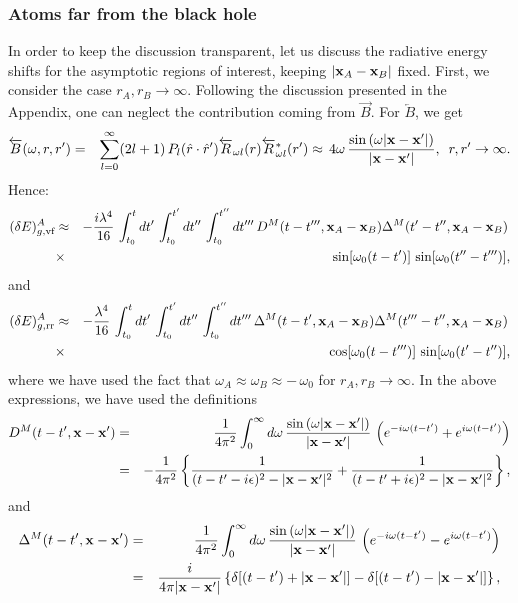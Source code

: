 \documentclass[twocolumn,prd,aps,showpacs,amsmath,amssymb]{revtex4-1}
\def\bea{\begin{eqnarray}}
\def\eea{\end{eqnarray}}
\def\nn{\nonumber}
\begin{document}
\begin{widetext}
\subsubsection{Atoms far from the black hole}
\label{sub:far}
%
In order to keep the discussion transparent, let us discuss the
radiative energy shifts for the asymptotic regions of interest,
keeping $|{\bf x}_{A} - {\bf x}_{B}|$ fixed. First, we consider the
case $r_{A}, r_{B} \to \infty$. Following the discussion presented in
the Appendix, one can neglect the contribution coming from
$\overrightarrow{B}$. For $\overleftarrow{B}$, we get 
%
\bea
\overleftarrow{B}(\omega, r, r') &=& \sum_{l=0}^{\infty}(2l +
1)\,P_{l}(\hat{r} \cdot \hat{r}')\overleftarrow{R}_{\omega
  l}(r)\overleftarrow{R}^{*}_{\omega l}(r')  
\approx\, 4\omega\,\frac{\sin\left(\omega|{\bf x} - {\bf
      x}'|\right)}{|{\bf x} - {\bf x}'|},\,\,\, r, r' \to \infty. 
\eea
%
Hence:
%
\bea
(\delta E)^{A}_{g,\textrm{vf}} &\approx& -\frac{i\lambda^4}{16}\,\int_{t_0}^{t}dt'\,\int_{t_0}^{t'}dt''\,\int_{t_0}^{t''}dt'''
\,D^{M}(t-t''',{\bf x}_{A}-{\bf x}_{B})\Delta^{M}(t'-t'',{\bf x}_{A}-{\bf x}_{B})\,
\nn\\
&\times&\,\sin[\omega_{0}(t - t')]\,\sin[\omega_{0}(t'' - t''')],
\label{vf-infinity}
\eea
%
and
%
\bea
(\delta E)^{A}_{g,\textrm{rr}} &\approx& -\frac{\lambda^4}{16}\,\int_{t_0}^{t}dt'\,\int_{t_0}^{t'}dt''\,\int_{t_0}^{t''}dt'''
\,\Delta^{M}(t-t',{\bf x}_{A}-{\bf x}_{B})\Delta^{M}(t'''-t'',{\bf x}_{A}-{\bf x}_{B})\,
\nn\\
&\times&\,\cos[\omega_{0}(t - t''')]\,\sin[\omega_{0}(t' - t'')],
\label{rr-infinity}
\eea
%
where we have used the fact that $\omega_{A} \approx \omega_{B}
\approx -\,\omega_0$ for $r_{A}, r_{B} \to \infty$. In the above
expressions, we have used the definitions 
%
\bea
D^{M}(t-t',{\bf x}-{\bf x}') &=& \frac{1}{4\pi^2}\int_{0}^{\infty} d\omega\,\frac{\sin\left(\omega|{\bf x} - {\bf x}'|\right)}
{|{\bf x} - {\bf x}'|}\,\left(e^{-i\omega(t-t')} + e^{i\omega(t-t')}\right)
\nn\\
&=& -\frac{1}{4\pi^2}\left\{\frac{1}{(t-t'-i\epsilon)^2 -|{\bf x} - {\bf x}'|^2} 
+ \frac{1}{(t-t'+i\epsilon)^2 -|{\bf x} - {\bf x}'|^2}\right\},
\eea
%
and
%
\bea\label{eq:reg}
\Delta^{M}(t-t',{\bf x}-{\bf x}') &=& \frac{1}{4\pi^2}\int_{0}^{\infty} d\omega\,\frac{\sin\left(\omega|{\bf x} - {\bf x}'|\right)}
{|{\bf x} - {\bf x}'|}\,\left(e^{-i\omega(t-t')} - e^{i\omega(t-t')}\right)
\nn\\
&=& \frac{i}{4\pi|{\bf x} - {\bf x}'|}\left\{\delta[(t-t')+|{\bf x} - {\bf x}'|] - \delta[(t-t')-|{\bf x} - {\bf x}'|]\right\},
\eea
%
\end{widetext}
\end{document}
